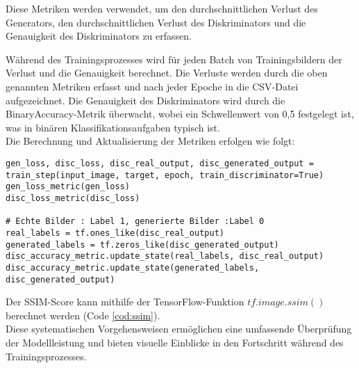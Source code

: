 Diese Metriken werden verwendet, um den durchschnittlichen Verlust des Generators, den durchschnittlichen Verlust des Diskriminators und die Genauigkeit des Diskriminators zu erfassen.

Während des Trainingsprozesses wird für jeden Batch von Trainingsbildern der Verlust und die Genauigkeit berechnet. Die Verluste werden durch die oben genannten Metriken erfasst und nach jeder Epoche in die CSV-Datei aufgezeichnet. Die Genauigkeit des Diskriminators wird durch die BinaryAccuracy-Metrik überwacht, wobei ein Schwellenwert von 0,5 festgelegt ist, was in binären Klassifikationsaufgaben typisch ist.
\\\newline
Die Berechnung und Aktualisierung der Metriken erfolgen wie folgt:

\begin{lstlisting}[language=pyhaff, caption={Aktualisierung der Metriken}, label={cod:updateMetrics}]
gen_loss, disc_loss, disc_real_output, disc_generated_output = train_step(input_image, target, epoch, train_discriminator=True)
gen_loss_metric(gen_loss)
disc_loss_metric(disc_loss)

# Echte Bilder : Label 1, generierte Bilder :Label 0
real_labels = tf.ones_like(disc_real_output)
generated_labels = tf.zeros_like(disc_generated_output)
disc_accuracy_metric.update_state(real_labels, disc_real_output)
disc_accuracy_metric.update_state(generated_labels, disc_generated_output)
\end{lstlisting}

Der SSIM-Score kann mithilfe der TensorFlow-Funktion $tf.image.ssim()$ berechnet werden (Code \ref{cod:ssim}).
\\\newline
Diese systematischen Vorgehensweisen ermöglichen eine umfassende Überprüfung der Modellleistung und bieten visuelle Einblicke in den Fortschritt während des Trainingsprozesses.